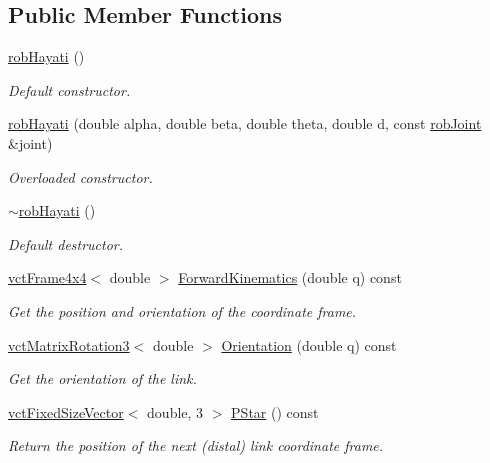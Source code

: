 \subsection*{Public Member Functions}
\begin{DoxyCompactItemize}
\item 
\hyperlink{classrob_hayati_a3d1ab57c428624dc6cf0efc8a31aa04b}{rob\-Hayati} ()
\begin{DoxyCompactList}\small\item\em Default constructor. \end{DoxyCompactList}\item 
\hyperlink{classrob_hayati_a26c86f28362457d8aac4b77f32cc4626}{rob\-Hayati} (double alpha, double beta, double theta, double d, const \hyperlink{classrob_joint}{rob\-Joint} \&joint)
\begin{DoxyCompactList}\small\item\em Overloaded constructor. \end{DoxyCompactList}\item 
\hyperlink{classrob_hayati_a7842583993380cc7534fb6b579d6e2d8}{$\sim$rob\-Hayati} ()
\begin{DoxyCompactList}\small\item\em Default destructor. \end{DoxyCompactList}\item 
\hyperlink{classvct_frame4x4}{vct\-Frame4x4}$<$ double $>$ \hyperlink{classrob_hayati_ae29971dc55363ca5a80d68cfde5b12a1}{Forward\-Kinematics} (double q) const 
\begin{DoxyCompactList}\small\item\em Get the position and orientation of the coordinate frame. \end{DoxyCompactList}\item 
\hyperlink{classvct_matrix_rotation3}{vct\-Matrix\-Rotation3}$<$ double $>$ \hyperlink{classrob_hayati_a1b06807f8d4ba90684e683ca361497b5}{Orientation} (double q) const 
\begin{DoxyCompactList}\small\item\em Get the orientation of the link. \end{DoxyCompactList}\item 
\hyperlink{classvct_fixed_size_vector}{vct\-Fixed\-Size\-Vector}$<$ double, 3 $>$ \hyperlink{classrob_hayati_af306b60415e866f652784edd0bc5b944}{P\-Star} () const 
\begin{DoxyCompactList}\small\item\em Return the position of the next (distal) link coordinate frame. \end{DoxyCompactList}\item 

\end{DoxyCompactItemize}
